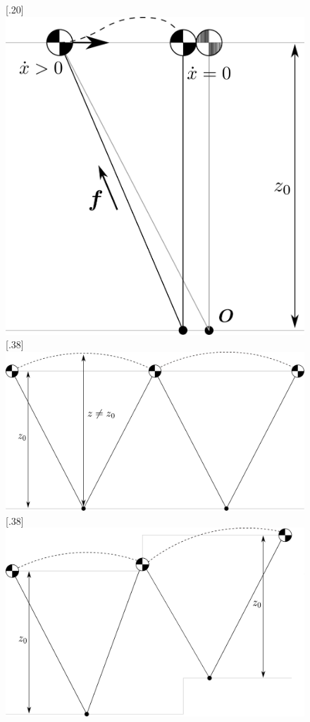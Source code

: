 \begin{figure}[h]
\centering
\subcaptionbox{\label{fig:hcp}}[.20\textwidth]{\includegraphics[width=0.9\linewidth]{STYLESTUFF/VaryingHeightCP.png}}
\hfill
\subcaptionbox{\label{fig:flat}}[.38\textwidth]{\includegraphics[width=0.97\linewidth]{STYLESTUFF/VaryingHeightflat.png}}
\hfill
\subcaptionbox{\label{fig:unflat}}[.38\textwidth]{\includegraphics[width=0.94\linewidth]{STYLESTUFF/VaryingHeightunflat.png}}

\end{figure}
